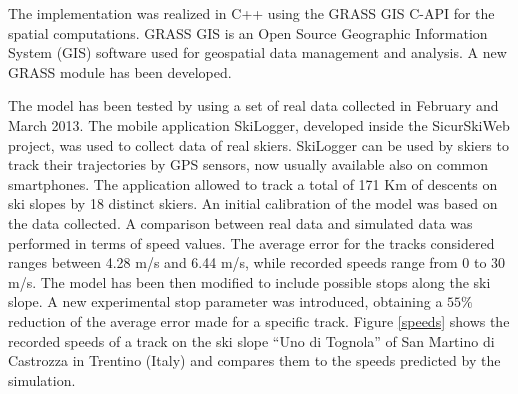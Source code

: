 \documentclass[12pt,a4paper,twoside]{book}
\begin{document}
The implementation was realized in C++ using the GRASS GIS C-API for the spatial computations. GRASS GIS is an Open Source Geographic Information System (GIS) software used for geospatial data management and analysis. A new GRASS module has been developed.

The model has been tested by using a set of real data collected in February and March 2013. The mobile application SkiLogger, developed inside the SicurSkiWeb project, was used to collect data of real skiers. SkiLogger can be used by skiers to track their trajectories by GPS sensors, now usually available also on common smartphones. The application allowed to track a total of 171 Km of descents on ski slopes by 18 distinct skiers. An initial calibration of the model was based on the data collected. A comparison between real data and simulated data was performed in terms of speed values. The average error for the tracks considered ranges between 4.28 m/s and 6.44 m/s, while recorded speeds range from 0 to 30 m/s. The model has been then modified to include possible stops along the ski slope. A new experimental stop parameter was introduced, obtaining a $55\%$ reduction of the average error made for a specific track. Figure \ref{speeds} shows the recorded speeds of a track on the ski slope ``Uno di Tognola'' of San Martino di Castrozza in Trentino (Italy) and compares them to the speeds predicted by the simulation.
\end{document}
